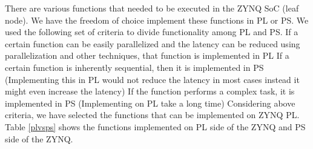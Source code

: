 \documentclass[12pt,a4paper]{report}
\begin{document}
There are various functions that needed to be executed in the ZYNQ SoC (leaf node). We have the freedom of choice implement these functions in PL or PS. We used the following set of criteria to divide functionality among PL and PS.
If a certain function can be easily parallelized and the latency can be reduced using parallelization and other techniques, that function is implemented in PL
If a certain function is inherently sequential, then it is implemented in PS (Implementing this in PL would not reduce the latency in most cases instead it might even increase the latency)
If the function performs a complex task, it is implemented in PS (Implementing on PL take a long time)
Considering above criteria, we have selected the functions that can be implemented on ZYNQ PL. Table \ref{plvsps} shows the functions implemented on PL side of the ZYNQ and PS side of the ZYNQ.
\end{document}
